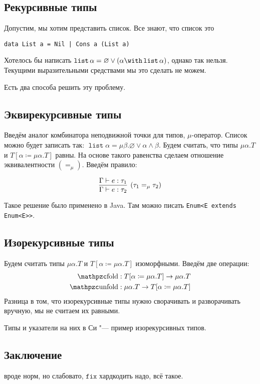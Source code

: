 \subsection{\texorpdfstring{Рекурсивные типы}{Recursive types}}
Допустим, мы хотим представить список. Все знают, что список это 
\begin{verbatim}
data List a = Nil | Cons a (List a)
\end{verbatim}
Хотелось бы написать $\operatorname{\mathtt{list}}\alpha=\varnothing\lor(\alpha\with\operatorname{\mathtt{list}}\alpha)$,
однако так нельзя.
Текущими выразительными средствами мы это сделать не можем.

Есть два способа решить эту проблему.

\subsection*{\texorpdfstring{Эквирекурсивные типы}{Equirecursive types}}
Введём аналог комбинатора неподвижной точки для типов, $\mu$-оператор.
Список можно будет записать так: $\operatorname{\mathtt{list}} \alpha = \mu \beta . \varnothing \lor \alpha \land \beta$.
Будем считать, что типы $\mu \alpha . T$ и $T[\alpha \coloneqq \mu \alpha.T]$ равны.
На основе такого равенства сделаем отношение эквивалентности $(=_\mu)$.
Введём правило:
\begin{bnf}
\[
    \infer[(\tau_1=_\mu \tau_2)]
        {\Gamma \vdash e : \tau_2}
        {\Gamma \vdash e : \tau_1}
\]%
\end{bnf}%

Такое решение было применено в Java. Там можно писать \texttt{Enum<E extends Enum<E>>}.

\subsection*{\texorpdfstring{Изорекурсивные типы}{Isorecursive types}}
Будем считать типы $\mu \alpha . T$ и $T[\alpha \coloneqq \mu \alpha.T]$ изоморфными.
Введём две операции:
\begin{align*}
    \comb{fold}   &: T[\alpha \coloneqq \mu \alpha.T] \rightarrow \mu \alpha . T \\
    \comb{unfold} &: \mu \alpha . T \rightarrow T[\alpha \coloneqq \mu \alpha.T]
\end{align*}
Разница в том, что изорекурсивные типы нужно сворачивать и разворачивать вручную, мы не считаем их равными.

Типы и указатели на них в Си "--- пример изорекурсивных типов.

\subsection*{\texorpdfstring{Заключение}{Conclusion}}
\todo вроде норм, но слабовато, $\mathtt{fix}$ хардкодить надо, всё такое.
